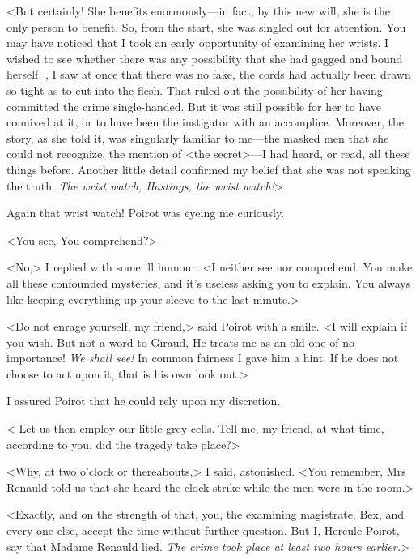  <But certainly! She benefits enormously—in fact, by this new will, she is the only person to benefit. So, from the start, she was singled out for attention. You may have noticed that I took an early opportunity of examining her wrists. I wished to see whether there was any possibility that she had gagged and bound herself. , I saw at once that there was no fake, the cords had actually been drawn so tight as to cut into the flesh. That ruled out the possibility of her having committed the crime single-handed. But it was still possible for her to have connived at it, or to have been the instigator with an accomplice. Moreover, the story, as she told it, was singularly familiar to me—the masked men that she could not recognize, the mention of <the secret>—I had heard, or read, all these things before. Another little detail confirmed my belief that she was not speaking the truth. \emph{The wrist watch, Hastings, the wrist watch!}> 

 Again that wrist watch! Poirot was eyeing me curiously. 

 <You see,  You comprehend?> 

 <No,> I replied with some ill humour. <I neither see nor comprehend. You make all these confounded mysteries, and it's useless asking you to explain. You always like keeping everything up your sleeve to the last minute.> 

 <Do not enrage yourself, my friend,> said Poirot with a smile. <I will explain if you wish. But not a word to Giraud,  He treats me as an old one of no importance! \emph{We shall see!} In common fairness I gave him a hint. If he does not choose to act upon it, that is his own look out.> 

 I assured Poirot that he could rely upon my discretion. 

 < Let us then employ our little grey cells. Tell me, my friend, at what time, according to you, did the tragedy take place?> 

 <Why, at two o'clock or thereabouts,> I said, astonished. <You remember, Mrs Renauld told us that she heard the clock strike while the men were in the room.> 

 <Exactly, and on the strength of that, you, the examining magistrate, Bex, and every one else, accept the time without further question. But I, Hercule Poirot, say that Madame Renauld lied. \emph{The crime took place at least two hours earlier.}> 

